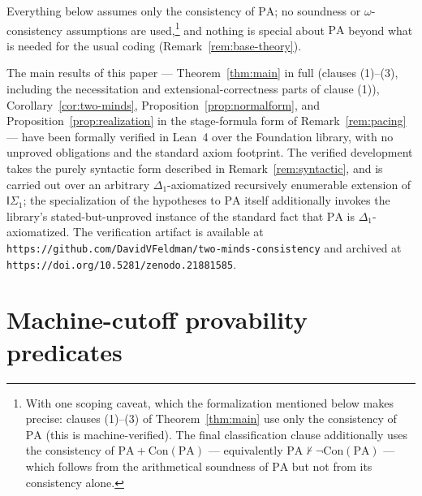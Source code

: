 \documentclass[11pt]{amsart}
\theoremstyle{definition}
\theoremstyle{remark}
\newcommand{\PA}{\mathrm{PA}}
\newcommand{\Con}{\mathrm{Con}}
\begin{document}
Everything below assumes only the consistency of $\PA$; no soundness or
$\omega$-consistency assumptions are used,\footnote{With one scoping
caveat, which the formalization mentioned below makes precise: clauses
(1)--(3) of Theorem~\ref{thm:main} use only the consistency of $\PA$
(this is machine-verified). The final classification clause additionally
uses the consistency of $\PA+\Con(\PA)$ --- equivalently
$\PA\nvdash\neg\Con(\PA)$ --- which follows from the arithmetical
soundness of $\PA$ but not from its consistency alone.} and nothing is
special about $\PA$ beyond what is needed for the usual coding
(Remark~\ref{rem:base-theory}).

The main results of this paper --- Theorem~\ref{thm:main} in full
(clauses (1)--(3), including the necessitation and
extensional-correctness parts of clause (1)),
Corollary~\ref{cor:two-minds}, Proposition~\ref{prop:normalform}, and
Proposition~\ref{prop:realization} in the stage-formula form of
Remark~\ref{rem:pacing} --- have been formally verified in Lean~4 over
the Foundation library, with no unproved obligations and the standard
axiom footprint. The verified development takes the purely syntactic
form described in Remark~\ref{rem:syntactic}, and is carried out over an
arbitrary $\Delta_1$-axiomatized recursively enumerable extension of
$\mathsf{I}\Sigma_1$; the specialization of the hypotheses to $\PA$
itself additionally invokes the library's stated-but-unproved instance
of the standard fact that $\PA$ is $\Delta_1$-axiomatized. The
verification artifact is available at
\texttt{https://github.com/DavidVFeldman/two-minds-consistency}
and archived at \texttt{https://doi.org/10.5281/zenodo.21881585}.

\section{Machine-cutoff provability predicates}\label{sec:defs}
\end{document}

